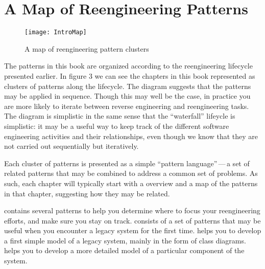 \documentclass[a4paper,10pt,twoside]{book}
\begin{document}
\section{A Map of Reengineering Patterns}

\begin{figure}
\begin{center}
\texttt{[image: IntroMap]}
\caption{A map of reengineering pattern clusters}
\end{center}
\end{figure}

The patterns in this book are organized according to the reengineering lifecycle presented earlier. In figure 3 we can see the chapters in this book represented as clusters of patterns along the lifecycle. The diagram suggests that the patterns may be applied in sequence. Though this may well be the case, in practice you are more likely to iterate between reverse engineering and reengineering tasks. The diagram is simplistic in the same sense that the ``waterfall'' lifeycle is simplistic: it may be a useful way to keep track of the different software engineering activities and their relationships, even though we know that they are not carried out sequentially but iteratively.

Each cluster of patterns is presented as a simple ``pattern language''\,---\,a set of related patterns that may be combined to address a common set of problems. As such, each chapter will typically start with a overview and a map of the patterns in that chapter, suggesting how they may be related.


 contains several patterns to help you determine where to focus your reengineering efforts, and make sure you stay on track.  consists of a set of patterns that may be useful when you encounter a legacy system for the first time.  helps you to develop a first simple model of a legacy system, mainly in the form of class diagrams.  helps you to develop a more detailed model of a particular component of the system.
\end{document}

